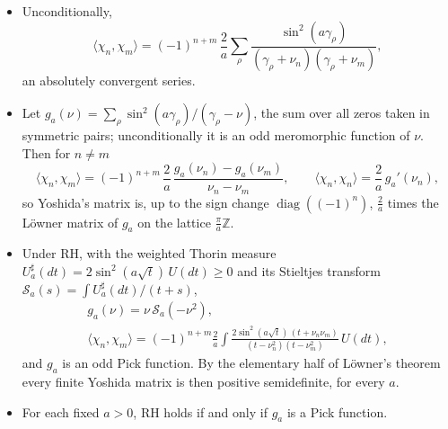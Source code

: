\begin{theorem}\label{yo:thm:lowner}
\begin{itemize}
\item[(i)] Unconditionally,
\[
\langle\chi_n,\chi_m\rangle=(-1)^{n+m}\,\frac2a\sum_\rho\frac{\sin^2(a\gamma_\rho)}{(\gamma_\rho+\nu_n)(\gamma_\rho+\nu_m)},
\]
an absolutely convergent series.
\item[(ii)] Let $g_a(\nu)=\sum_\rho\sin^2(a\gamma_\rho)/(\gamma_\rho-\nu)$, the sum over all zeros taken in symmetric pairs; unconditionally it is an odd meromorphic function of $\nu$. Then for $n\ne m$
\[
\langle\chi_n,\chi_m\rangle=(-1)^{n+m}\,\frac2a\,\frac{g_a(\nu_n)-g_a(\nu_m)}{\nu_n-\nu_m},\qquad \langle\chi_n,\chi_n\rangle=\frac2a\,g_a'(\nu_n),
\]
so Yoshida's matrix is, up to the sign change $\operatorname{diag}((-1)^n)$, $\frac2a$ times the L\"owner matrix of $g_a$ on the lattice $\frac\pi a\mathbb Z$.
\item[(iii)] Under RH, with the weighted Thorin measure $U_a^\sharp(dt)=2\sin^2(a\sqrt t)\,U(dt)\ge0$ and its Stieltjes transform $\mathcal S_a(s)=\int U_a^\sharp(dt)/(t+s)$,
\[
\begin{gathered}
g_a(\nu)=\nu\,\mathcal S_a(-\nu^2),\\
\langle\chi_n,\chi_m\rangle=(-1)^{n+m}\frac2a\int\frac{2\sin^2(a\sqrt t)\,(t+\nu_n\nu_m)}{(t-\nu_n^2)(t-\nu_m^2)}\,U(dt),
\end{gathered}
\]
and $g_a$ is an odd Pick function. By the elementary half of L\"owner's theorem every finite Yoshida matrix is then positive semidefinite, for every $a$.
\item[(iv)] For each fixed $a>0$, RH holds if and only if $g_a$ is a Pick function.
\end{itemize}
\end{theorem}

